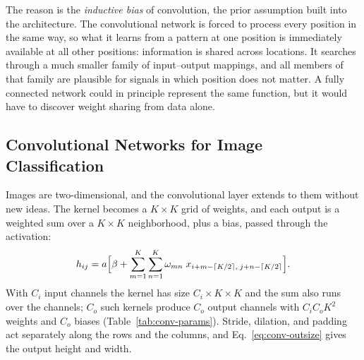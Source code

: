 The reason is the \emph{inductive bias} of convolution, the prior assumption
built into the architecture. The convolutional network is forced to process
every position in the same way, so what it learns from a pattern at one position
is immediately available at all other positions: information is shared across
locations. It searches through a much smaller family of input--output mappings,
and all members of that family are plausible for signals in which position does
not matter. A fully connected network could in principle represent the same
function, but it would have to discover weight sharing from data alone.

\subsection{Convolutional Networks for Image Classification}

Images are two-dimensional, and the convolutional layer extends to them without
new ideas. The kernel becomes a $K\times K$ grid of weights, and each output is a
weighted sum over a $K\times K$ neighborhood, plus a bias, passed through the
activation:
\begin{equation}
  h_{ij} = a\Bigl[\beta + \sum_{m=1}^{K}\sum_{n=1}^{K}
    \omega_{mn}\; x_{i+m-\lceil K/2\rceil,\; j+n-\lceil K/2\rceil}\Bigr].
\end{equation}
\noindent
With $C_i$ input channels the kernel has size $C_i\times K\times K$ and the sum
also runs over the channels; $C_o$ such kernels produce $C_o$ output channels
with $C_i C_o K^2$ weights and $C_o$ biases (Table~\ref{tab:conv-params}).
Stride, dilation, and padding act separately along the rows and the columns,
and Eq.~\eqref{eq:conv-outsize} gives the output height and width.

